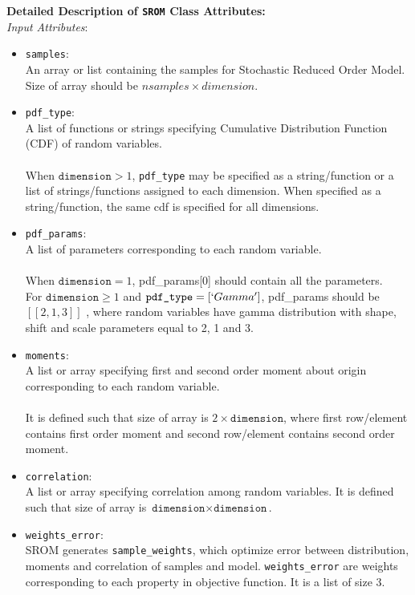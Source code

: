 \noindent\textbf{Detailed Description of \texttt{SROM} Class Attributes:}\\

\noindent\textit{Input Attributes}:
\begin{itemize}
\item \texttt{samples}:\\ 
An array or list containing the samples for Stochastic Reduced Order Model. Size of array should be $nsamples \times dimension$. 

\item \texttt{pdf\_type}:\\ 
A list of functions or strings specifying Cumulative Distribution Function (CDF) of random variables.\\ \\
When $\texttt{dimension}>1$, \texttt{pdf\_type} may be specified as a string/function or a list of strings/functions assigned to each dimension. When specified as a string/function, the same cdf is specified for all dimensions.

\item \texttt{pdf\_params}:\\ 
A list of parameters corresponding to each random variable. \\ \\
When $\texttt{dimension}=1$, pdf\_params[0] should contain all the parameters. \\
For $\texttt{dimension} \geq 1$ and $\texttt{pdf\_type} = [`Gamma']$, pdf\_params should be $[[2,1,3]]$ , where random variables have gamma distribution with shape, shift and scale parameters equal to 2, 1 and 3.

\item \texttt{moments}:\\ 
A list or array specifying first and second order moment about origin corresponding to each random variable. \\ \\
It is defined such that size of array is $2 \times \texttt{dimension}$, where first row/element contains first order moment and second row/element contains second order moment.

\item \texttt{correlation}:\\ 
A list or array specifying correlation among random variables. It is defined such that size of array is $\texttt{dimension} \times \texttt{dimension}$.

\item \texttt{weights\_error}:\\
SROM generates \texttt{sample\_weights}, which optimize error between distribution, moments and correlation of samples and model.   \texttt{weights\_error} are weights corresponding to each property in objective function. It is a list of size 3.


\end{itemize}
